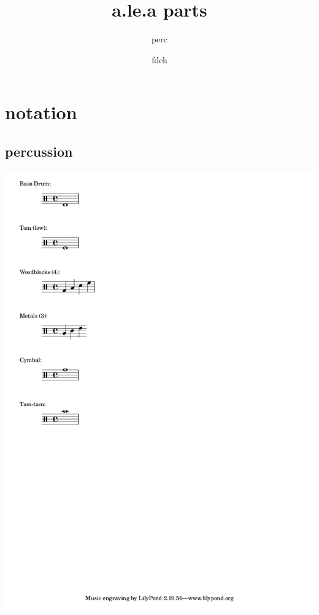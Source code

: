 \documentclass[12pt, lettersize]{book}
\title{a.le.a parts}
\author{perc}
\date{fdch}
\begin{document}
\maketitle


\section{notation} \subsection{percussion} \includegraphics[]{../../../../../reference/perc-setup.png}

\newpage
\null
\thispagestyle{blank}
\newpage


\end{document}
